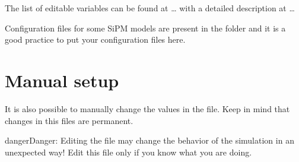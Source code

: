 \documentclass[letterpaper,10pt,english]{sphinxmanual}
\begin{document}
\begin{DUlineblock}{0em}
\item[] The list of editable variables can be found at … with a detailed description at …
\item[] Configuration files for some SiPM models are present in the  folder and it is a good practice to put your configuration files here.
\end{DUlineblock}


\section{Manual setup}
\label{\detokenize{setup:manual-setup}}
It is also possible to manually change the values in the  file. Keep in mind that changes in this files are permanent.

\begin{sphinxadmonition}{danger}{Danger:}
Editing the  file may change the behavior of the simulation in an unexpected way! Edit this file only if you know what you are doing.
\end{sphinxadmonition}
\end{document}
